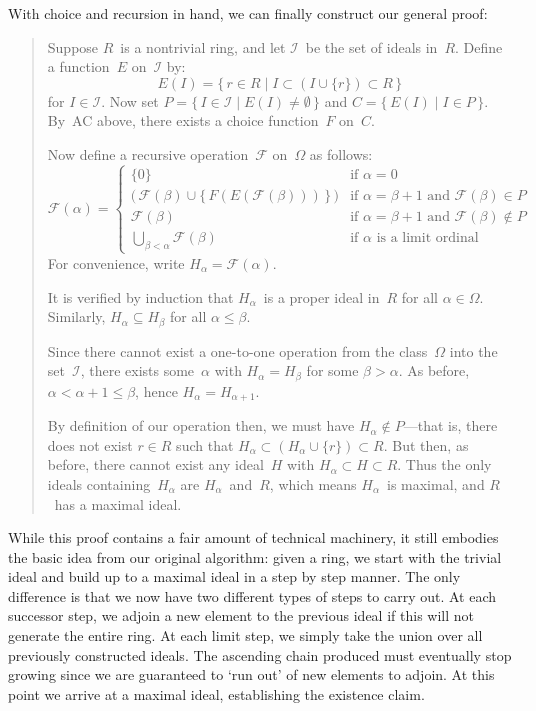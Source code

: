 \documentclass[letterpaper]{article}
\newcommand{\I}{\mathcal{I}}
\newcommand{\F}{\mathcal{F}}
\newcommand{\union}{\cup}
\newcommand{\bigunion}{\bigcup}
\begin{document}
With choice and recursion in hand, we can finally construct our general proof:
\begin{quote}
Suppose $R$~is a nontrivial ring, and let $\I$~be the set of ideals in~$R$. Define a function~$E$ on~$\I$ by:
$$E(I)=\{\,r\in R\mid I\subset(I\union\{r\})\subset R\,\}$$
for $I\in\I$. Now set $P=\{\,I\in\I\mid E(I)\ne\emptyset\,\}$ and $C=\{\,E(I)\mid I\in P\,\}$. By~AC above, there exists a choice function~$F$ on~$C$.

Now define a recursive operation~$\F$ on~$\Omega$ as follows:
$$\F(\alpha)=
\begin{cases}
\{0\}&\text{if }\alpha=0\\
\bigl(\,\F(\beta)\union\{\,F(E(\F(\beta)))\,\}\,\bigr)&\text{if }\alpha=\beta+1\text{ and }\F(\beta)\in P\\
\F(\beta)&\text{if }\alpha=\beta+1\text{ and }\F(\beta)\not\in P\\
\bigunion_{\beta<\alpha}\F(\beta)&\text{if }\alpha\text{ is a limit ordinal}
\end{cases}$$
For convenience, write $H_{\alpha}=\F(\alpha)$.

It is verified by induction that $H_{\alpha}$~is a proper ideal in~$R$ for all $\alpha\in\Omega$. Similarly, $H_{\alpha}\subseteq H_{\beta}$ for all $\alpha\le\beta$.

Since there cannot exist a one-to-one operation from the class~$\Omega$ into the set~$\I$, there exists some~$\alpha$ with $H_{\alpha}=H_{\beta}$ for some $\beta>\alpha$. As before, $\alpha<\alpha+1\le\beta$, hence $H_{\alpha}=H_{\alpha+1}$.

By definition of our operation then, we must have $H_{\alpha}\not\in P$---that is, there does not exist $r\in R$ such that $H_{\alpha}\subset (H_{\alpha}\union\{r\})\subset R$. But then, as before, there cannot exist any ideal~$H$ with $H_{\alpha}\subset H\subset R$. Thus the only ideals containing~$H_{\alpha}$ are $H_{\alpha}$~and~$R$, which means $H_{\alpha}$~is maximal, and $R$~has a maximal ideal.
\end{quote}
While this proof contains a fair amount of technical machinery, it still embodies the basic idea from our original algorithm: given a ring, we start with the trivial ideal and build up to a maximal ideal in a step by step manner. The only difference is that we now have two different types of steps to carry out. At each successor step, we adjoin a new element to the previous ideal if this will not generate the entire ring. At each limit step, we simply take the union over all previously constructed ideals. The ascending chain produced must eventually stop growing since we are guaranteed to `run out' of new elements to adjoin. At this point we arrive at a maximal ideal, establishing the existence claim.
\end{document}
